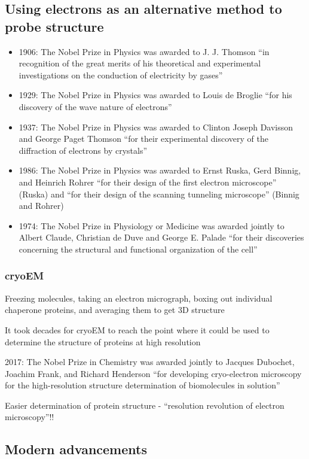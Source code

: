 \documentclass[letterpaper, 12pt]{article}
\begin{document}
\subsection*{Using electrons as an alternative method to probe structure}
\begin{itemize}
\item 1906: The Nobel Prize in Physics was awarded to J. J. Thomson ``in recognition of the great merits of his theoretical and experimental investigations on the conduction of electricity by gases''
\item 1929: The Nobel Prize in Physics was awarded to Louis de Broglie ``for his discovery of the wave nature of electrons''
\item 1937: The Nobel Prize in Physics was awarded to Clinton Joseph Davisson and George Paget Thomson ``for their experimental discovery of the diffraction of electrons by crystals''
\item 1986: The Nobel Prize in Physics was awarded to Ernst Ruska, Gerd Binnig, and Heinrich Rohrer ``for their design of the first electron microscope'' (Ruska) and ``for their design of the scanning tunneling microscope'' (Binnig and Rohrer)
\item 1974: The Nobel Prize in Physiology or Medicine was awarded jointly to Albert Claude, Christian de Duve and George E. Palade ``for their discoveries concerning the structural and functional organization of the cell''
\end{itemize}

\subsubsection*{cryoEM}
Freezing molecules, taking an electron micrograph, boxing out individual chaperone proteins, and averaging them to get 3D structure

It took decades for cryoEM to reach the point where it could be used to determine the structure of proteins at high resolution

2017: The Nobel Prize in Chemistry was awarded jointly to Jacques Dubochet, Joachim Frank, and Richard Henderson ``for developing cryo-electron microscopy for the high-resolution structure determination of biomolecules in solution''

Easier determination of protein structure - ``resolution revolution of electron microscopy''!!

\subsection*{Modern advancements}
\end{document}
